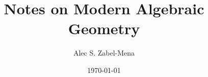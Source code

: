 \documentclass[12pt, twoside]{book}
\title{Notes on Modern Algebraic Geometry}
\author{Alec S. Zabel-Mena}
\date{\today}
\begin{document}
\maketitle
\tableofcontents
\newpage



\nocite{*}



\end{document}
